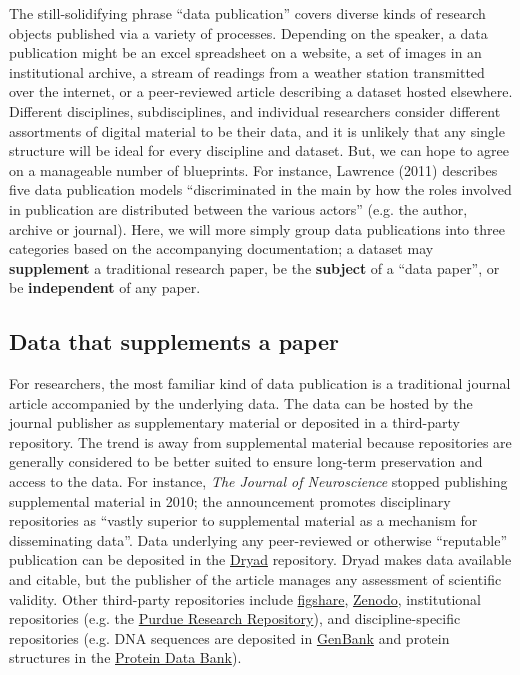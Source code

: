 \documentclass[10pt,twocolumn]{article}
\begin{document}
The still-solidifying phrase ``data publication'' covers diverse kinds of research objects published via a variety of processes.
Depending on the speaker, a data publication might be an excel spreadsheet on a website, a set of images in an institutional archive, a stream of readings from a weather station transmitted over the internet, or a peer-reviewed article describing a dataset hosted elsewhere.
Different disciplines, subdisciplines, and individual researchers consider different assortments of digital material to be their data, and it is unlikely that any single structure will be ideal for every discipline and dataset.
But, we can hope to agree on a manageable number of blueprints.
For instance, Lawrence (2011) describes five data publication models ``discriminated in the main by how the roles involved in publication are distributed between the various actors'' (e.g. the author, archive or journal).\cite{lawrence_data_2011}
Here, we will more simply group data publications into three categories based on the accompanying documentation; a dataset may \textbf{supplement} a traditional research paper, be the \textbf{subject} of a ``data paper'', or be \textbf{independent} of any paper.

\subsection*{Data that supplements a paper}\label{paper-supplement-data}

For researchers, the most familiar kind of data publication is a traditional journal article accompanied by the underlying data.
The data can be hosted by the journal publisher as supplementary material or deposited in a third-party repository.
The trend is away from supplemental material because repositories are generally considered to be better suited to ensure long-term preservation and access to the data.
For instance, \emph{The Journal of Neuroscience} stopped publishing supplemental material in 2010; the announcement promotes disciplinary repositories as ``vastly superior to supplemental material as a mechanism for disseminating data''\cite{maunsell_announcement_2010}.
Data underlying any peer-reviewed or otherwise ``reputable'' publication can be deposited in the \href{http://datadryad.org/}{Dryad} repository.
Dryad makes data available and citable, but the publisher of the article manages any assessment of scientific validity.
Other third-party repositories include \href{http://figshare.com/}{figshare}, \href{http://zenodo.org/}{Zenodo}, institutional repositories (e.g. the \href{https://purr.purdue.edu/}{Purdue Research Repository}), and discipline-specific repositories (e.g. DNA sequences are deposited in \href{http://www.ncbi.nlm.nih.gov/genbank/}{GenBank}\cite{benson_genbank_2013} and protein structures in the \href{http://www.rcsb.org/}{Protein Data Bank}\cite{berman_protein_2000}).
\end{document}
